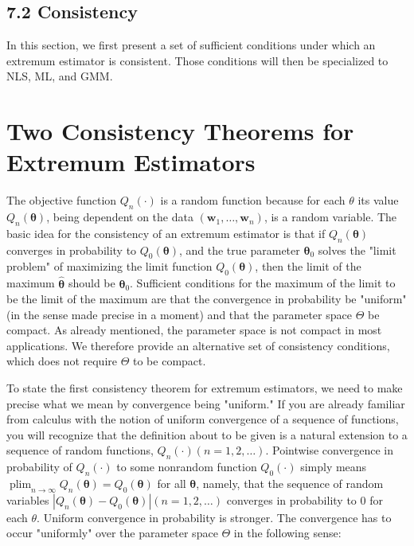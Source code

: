 \documentclass[10pt]{article}
\begin{document}
\subsection*{7.2 Consistency}
In this section, we first present a set of sufficient conditions under which an extremum estimator is consistent. Those conditions will then be specialized to NLS, ML, and GMM.

\section*{Two Consistency Theorems for Extremum Estimators}
The objective function $Q_{n}(\cdot)$ is a random function because for each $\theta$ its value $Q_{n}(\boldsymbol{\theta})$, being dependent on the data $\left(\mathbf{w}_{1}, \ldots, \mathbf{w}_{n}\right)$, is a random variable. The basic idea for the consistency of an extremum estimator is that if $Q_{n}(\boldsymbol{\theta})$ converges in probability to $Q_{0}(\boldsymbol{\theta})$, and the true parameter $\boldsymbol{\theta}_{0}$ solves the "limit problem" of maximizing the limit function $Q_{0}(\boldsymbol{\theta})$, then the limit of the maximum $\hat{\boldsymbol{\theta}}$ should be $\boldsymbol{\theta}_{0}$. Sufficient conditions for the maximum of the limit to be the limit of the maximum are that the convergence in probability be "uniform" (in the sense made precise in a moment) and that the parameter space $\Theta$ be compact. As already mentioned, the parameter space is not compact in most applications. We therefore provide an alternative set of consistency conditions, which does not require $\Theta$ to be compact.

To state the first consistency theorem for extremum estimators, we need to make precise what we mean by convergence being "uniform." If you are already familiar from calculus with the notion of uniform convergence of a sequence of functions, you will recognize that the definition about to be given is a natural extension to a sequence of random functions, $Q_{n}(\cdot)(n=1,2, \ldots)$. Pointwise convergence in probability of $Q_{n}(\cdot)$ to some nonrandom function $Q_{0}(\cdot)$ simply means $\operatorname{plim}_{n \rightarrow \infty} Q_{n}(\boldsymbol{\theta})=Q_{0}(\boldsymbol{\theta})$ for all $\boldsymbol{\theta}$, namely, that the sequence of random\\
variables $\left|Q_{n}(\boldsymbol{\theta})-Q_{0}(\boldsymbol{\theta})\right|(n=1,2, \ldots)$ converges in probability to 0 for each $\theta$. Uniform convergence in probability is stronger. The convergence has to occur "uniformly" over the parameter space $\Theta$ in the following sense:
\end{document}

